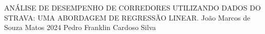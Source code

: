 \documentclass[12pt,openright]{report}
\begin{document}
%
%
%
\capa
{ANÁLISE DE DESEMPENHO DE CORREDORES UTILIZANDO DADOS DO STRAVA: UMA ABORDAGEM DE REGRESSÃO LINEAR.}
{João Marcos de Souza Matos}
{2024}
{Pedro Franklin Cardoso Silva}
% 
%
\end{document}
